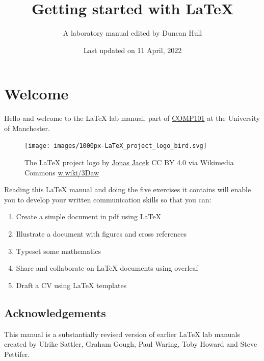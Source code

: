 \documentclass[
]{book}
\title{Getting started with LaTeX}
\author{A laboratory manual edited by Duncan Hull}
\date{Last updated on 11 April, 2022}
\providecommand{\tightlist}{%
  \setlength{\itemsep}{0pt}\setlength{\parskip}{0pt}}
\begin{document}
\maketitle

{
\setcounter{tocdepth}{1}
\tableofcontents
}
\hypertarget{welcome}{%
\chapter*{Welcome}\label{welcome}}

Hello and welcome to the LaTeX lab manual, part of \href{https://studentnet.cs.manchester.ac.uk/ugt/COMP10120/syllabus/}{COMP101} at the University of Manchester.

\begin{figure}

{\centering \texttt{[image: images/1000px-LaTeX\_project\_logo\_bird.svg]} 

}

\caption{The LaTeX project logo by \href{https://www.jonas.me/}{Jonas Jacek} CC BY 4.0 via Wikimedia Commons \href{https://w.wiki/3Daw}{w.wiki/3Daw}}\label{fig:latexproject-fig}
\end{figure}



Reading this LaTeX manual and doing the five exercises it contains will enable you to develop your written communication skills so that you can:

\begin{enumerate}
\def\labelenumi{\arabic{enumi}.}
\tightlist
\item
  Create a simple document in pdf using LaTeX
\item
  Illustrate a document with figures and cross references
\item
  Typeset some mathematics
\item
  Share and collaborate on LaTeX documents using overleaf
\item
  Draft a CV using LaTeX templates
\end{enumerate}

\hypertarget{acknowledgements}{%
\section*{Acknowledgements}\label{acknowledgements}}

This manual is a substantially revised version of earlier LaTeX lab manuals created by Ulrike Sattler, Graham Gough, Paul Waring, Toby Howard and Steve Pettifer.
\end{document}
